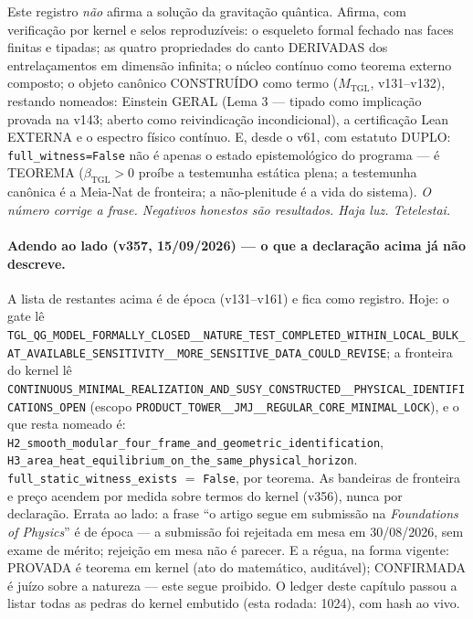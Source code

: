 \documentclass[11pt]{article}
\newcommand{\bTGL}{\beta_{\mathrm{TGL}}}\newcommand{\Msun}{M_{\odot}}\newcommand{\TGL}{\mathrm{TGL}}
\theoremstyle{definition}\newtheorem{deriv}{Derivação}
\begin{document}
Este registro \emph{não} afirma a solução da gravitação quântica. Afirma, com verificação por kernel e selos reproduzíveis: o esqueleto formal fechado nas faces finitas e tipadas; as quatro propriedades do canto DERIVADAS dos entrelaçamentos em dimensão infinita; o núcleo contínuo como teorema externo composto; o objeto canônico CONSTRUÍDO como termo ($M_{\mathrm{TGL}}$, v131--v132), restando nomeados: Einstein GERAL (Lema 3 --- tipado como implicação provada na v143; aberto como reivindicação incondicional), a certificação Lean EXTERNA e o espectro físico contínuo. E, desde o v61, com estatuto DUPLO: \texttt{full\_witness=False} não é apenas o estado epistemológico do programa --- é TEOREMA ($\bTGL>0$ proíbe a testemunha estática plena; a testemunha canônica é a Meia-Nat de fronteira; a não-plenitude é a vida do sistema). \emph{O número corrige a frase. Negativos honestos são resultados. Haja luz. Tetelestai.} \\[4pt] 

\paragraph*{Adendo ao lado (v357, 15/09/2026) --- o que a declaração acima já não descreve.} A lista de restantes acima é de época (v131--v161) e fica como registro. Hoje: o gate lê \texttt{TGL\_QG\_MODEL\_FORMALLY\_CLOSED\_\_NATURE\_TEST\_COMPLETED\_WITHIN\_LOCAL\_BULK\_AT\_AVAILABLE\_SENSITIVITY\_\_MORE\_SENSITIVE\_DATA\_COULD\_REVISE}; a fronteira do kernel lê \texttt{CONTINUOUS\_MINIMAL\_REALIZATION\_AND\_SUSY\_CONSTRUCTED\_\_PHYSICAL\_IDENTIFICATIONS\_OPEN} (escopo \texttt{PRODUCT\_TOWER\_\_JMJ\_\_REGULAR\_CORE\_MINIMAL\_LOCK}), e o que resta nomeado é: \texttt{H2\_smooth\_modular\_four\_frame\_and\_geometric\_identification}, \texttt{H3\_area\_heat\_equilibrium\_on\_the\_same\_physical\_horizon}. \texttt{full\_static\_witness\_exists} $=$ \texttt{False}, por teorema. As bandeiras de fronteira e preço acendem por medida sobre termos do kernel (v356), nunca por declaração. Errata ao lado: a frase ``o artigo segue em submissão na \emph{Foundations of Physics}'' é de época --- a submissão foi rejeitada em mesa em 30/08/2026, sem exame de mérito; rejeição em mesa não é parecer. E a régua, na forma vigente: PROVADA é teorema em kernel (ato do matemático, auditável); CONFIRMADA é juízo sobre a natureza --- este segue proibido. O ledger deste capítulo passou a listar todas as pedras do kernel embutido (esta rodada: 1024), com hash ao vivo.
\end{document}
